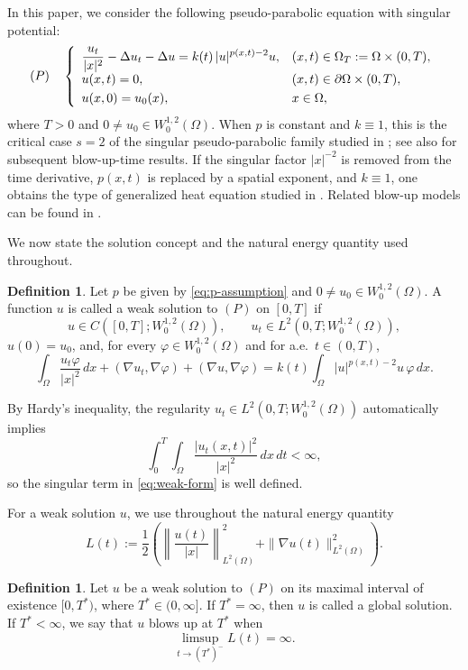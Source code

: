 \documentclass[12pt,reqno]{amsart}
\theoremstyle{definition}
\newtheorem{definition}[theorem]{Definition}
\theoremstyle{remark}
\numberwithin{equation}{section}
\begin{document}
In this paper, we consider the following pseudo-parabolic equation with singular potential:
\[
(P) \quad	\left\{\begin{array}{ll}
	\displaystyle\frac{u_t}{|x|^2} - \Delta u_t- \Delta u = k(t) \, |u|^{p(x,t)-2}u, & (x,t) \in \Omega_T := \Omega \times (0,T),
	\\
	u(x,t) = 0, & (x,t) \in \partial \Omega \times (0,T), \smallskip\\
	u(x,0) = u_0(x), & x \in \Omega,
\end{array}\right.
\]
where $T > 0$ and $0 \ne u_0 \in W^{1,2}_0(\Omega)$.
When $p$ is constant and $k\equiv1$, this is the critical case $s=2$ of the singular pseudo-parabolic family studied in \cite{LWX}; see also \cite{SHO,YPC} for subsequent blow-up-time results. If the singular factor $|x|^{-2}$ is removed from the time derivative, $p(x,t)$ is replaced by a spatial exponent, and $k\equiv1$, one obtains the type of generalized heat equation studied in \cite{AMK}. Related blow-up models can be found in \cite{BGH,DSP,Do,SLW,TTDa,TTDb}.

We now state the solution concept and the natural energy quantity used throughout.


\begin{definition}
	Let $p$ be given by \eqref{eq:p-assumption} and $0 \ne u_0 \in W^{1,2}_0(\Omega)$.
	A function $u$ is called a weak solution to $(P)$ on $[0,T]$ if
	\[
		u \in C([0,T];W^{1,2}_0(\Omega)),
		\qquad
		u_t \in L^2(0,T;W^{1,2}_0(\Omega)),
	\]
	$u(0)=u_0$, and, for every $\varphi\in W^{1,2}_0(\Omega)$ and for a.e.\ $t\in(0,T)$,
	\begin{equation} \label{eq:weak-form}
		\int_\Omega \frac{u_t\varphi}{|x|^2}\,dx
		+ (\nabla u_t,\nabla\varphi)
		+ (\nabla u,\nabla\varphi)
		= k(t)\int_\Omega |u|^{p(x,t)-2}u\,\varphi\,dx.
	\end{equation}
\end{definition}
By Hardy's inequality, the regularity $u_t\in L^2(0,T;W^{1,2}_0(\Omega))$ automatically implies
\[
\int_0^T\int_\Omega \frac{|u_t(x,t)|^2}{|x|^2}\,dx\,dt<\infty,
\]
so the singular term in \eqref{eq:weak-form} is well defined.

For a weak solution $u$, we use throughout the natural energy quantity
\begin{equation} \label{eq:L-def}
	L(t):=\frac12\left(
	\left\|\frac{u(t)}{|x|}\right\|_{L^2(\Omega)}^2
	+\|\nabla u(t)\|_{L^2(\Omega)}^2
	\right).
\end{equation}

\begin{definition}
	Let $u$ be a weak solution to $(P)$ on its maximal interval of existence $[0,T^*)$, where $T^*\in(0,\infty]$.
	If $T^*=\infty$, then $u$ is called a global solution. If $T^*<\infty$, we say that $u$ blows up at $T^*$ when
	\begin{equation} \label{eq:blowup}
		\limsup_{t\to(T^*)^-}L(t)=\infty.
	\end{equation}
\end{definition}
\end{document}
